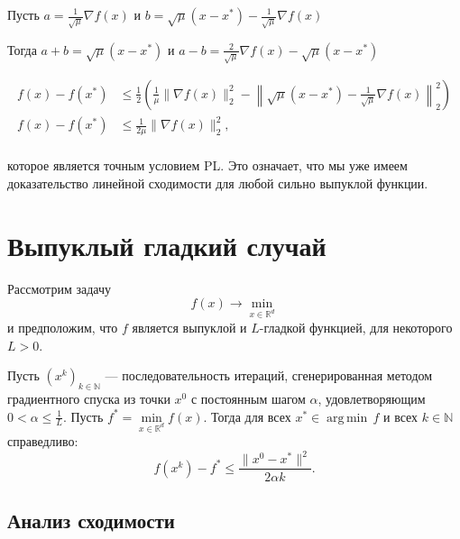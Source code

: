 \documentclass[
  russian,
  letterpaper,
  DIV=11,
  numbers=noendperiod]{scrartcl}
\begin{document}
Пусть \(a = \frac{1}{\sqrt{\mu}}\nabla f(x)\) и
\(b =\sqrt{\mu}(x-x^*) -\frac{1}{\sqrt{\mu}}\nabla f(x)\)

Тогда \(a+b = \sqrt{\mu}(x-x^*)\) и
\(a-b=\frac{2}{\sqrt{\mu}}\nabla f(x)-\sqrt{\mu}(x-x^*)\)

\[
\begin{split}
f(x) - f(x^*) &\leq \frac12 \left(\frac{1}{\mu}\|\nabla f(x)\|^2_2 - \left\|\sqrt{\mu}(x-x^*) -\frac{1}{\sqrt{\mu}}\nabla f(x)\right\|_2^2\right) \\ 
    f(x) - f(x^*) &\leq \frac{1}{2\mu}\|\nabla f(x)\|^2_2, \\ 
    \end{split}
    \]

которое является точным условием PL. Это означает, что мы уже имеем
доказательство линейной сходимости для любой сильно выпуклой функции.

\section{Выпуклый гладкий
случай}\label{ux432ux44bux43fux443ux43aux43bux44bux439-ux433ux43bux430ux434ux43aux438ux439-ux441ux43bux443ux447ux430ux439}

\begin{tcolorbox}[enhanced jigsaw, bottomrule=.15mm, coltitle=black, opacitybacktitle=0.6, colbacktitle=quarto-callout-color!10!white, colback=white, opacityback=0, toprule=.15mm, bottomtitle=1mm, toptitle=1mm, arc=.35mm, title=\textcolor{quarto-callout-color}{\faInfo}\hspace{0.5em}{Theorem}, titlerule=0mm, rightrule=.15mm, leftrule=.75mm, left=2mm, colframe=quarto-callout-color-frame, breakable]

Рассмотрим задачу \[
f(x) \to \min_{x \in \mathbb{R}^d}
\] и предположим, что \(f\) является выпуклой и \(L\)-гладкой функцией,
для некоторого \(L>0\).

Пусть \((x^{k})_{k \in \mathbb{N}}\) --- последовательность итераций,
сгенерированная методом градиентного спуска из точки \(x^0\) с
постоянным шагом \(\alpha\), удовлетворяющим
\(0 < \alpha\leq \frac{1}{L}\). Пусть
\(f^* = \min\limits_{x \in \mathbb{R}^d} f(x)\). Тогда для всех
\(x^* \in \operatorname*{arg\,min}\, f\) и всех \(k \in \mathbb{N}\)
справедливо: \[
f(x^{k})-f^* \leq \frac{\|x^0-x^*\| ^2}{2 \alpha k}.
\]

\end{tcolorbox}

\subsection{Анализ
сходимости}\label{ux430ux43dux430ux43bux438ux437-ux441ux445ux43eux434ux438ux43cux43eux441ux442ux438-2}
\end{document}
